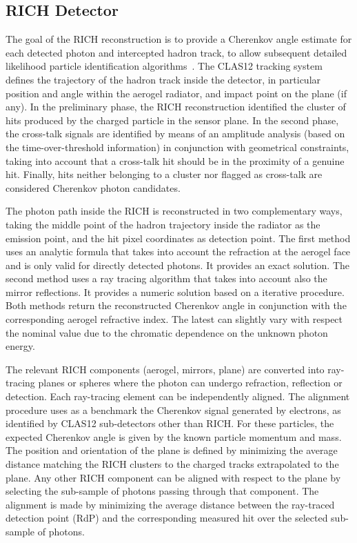 \subsection{RICH Detector}

The goal of the RICH reconstruction is to provide a Cherenkov angle estimate for each detected photon and intercepted hadron track, to allow subsequent detailed likelihood particle identification algorithms~\cite{rich-nim}. The CLAS12 tracking system defines the trajectory of the hadron track inside the detector, in particular position and angle within the aerogel radiator, and impact point on the \MaPMT plane (if any). In the preliminary phase, the RICH reconstruction identified the cluster of hits produced by the charged particle in the sensor plane. In the second phase, the cross-talk signals are identified by means of an amplitude analysis (based on the time-over-threshold information) in conjunction with geometrical constraints, taking into account that a cross-talk hit should be in the proximity of a genuine hit. Finally, hits neither belonging to a cluster nor flagged as cross-talk are considered Cherenkov photon candidates. 

The photon path inside the RICH is reconstructed in two complementary ways, taking the middle point of the hadron trajectory inside the radiator as the emission point, and the hit pixel coordinates as detection point. The first method uses an analytic formula that takes into account the refraction at the aerogel face and is only valid for directly detected photons. It provides an exact solution. The second method uses a ray tracing algorithm that takes into account also the mirror reflections. It provides a numeric solution based on a iterative procedure. Both methods return the reconstructed Cherenkov angle in conjunction with the corresponding aerogel refractive index. The latest can slightly vary with respect the nominal value due to the chromatic dependence on the unknown photon energy.

The relevant RICH components (aerogel, mirrors, \MaPMT plane) are converted into ray-tracing planes or spheres where the photon can undergo refraction, reflection or detection. Each ray-tracing element can be independently aligned. The alignment procedure uses as a benchmark the Cherenkov signal generated by electrons, as identified by CLAS12 sub-detectors other than RICH. For these particles, the expected Cherenkov angle is given by the known particle momentum and mass. The position and orientation of the \MaPMT plane is defined by minimizing the average distance matching the RICH clusters to the charged tracks extrapolated to the \MaPMT plane. Any other RICH component can be aligned with respect to the \MaPMT plane by selecting the sub-sample of photons passing through that component. The alignment is made by minimizing the average distance between the ray-traced detection point (RdP) and the corresponding measured \MaPMT hit over the selected sub-sample of photons.

